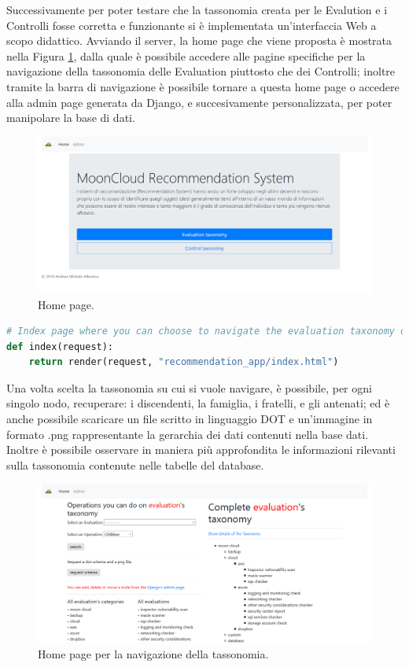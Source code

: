 %
\newpage
%
\hfill\break
Successivamente per poter testare che la tassonomia creata per le Evalution e i Controlli fosse corretta e funzionante si è 
implementata un'interfaccia Web a scopo didattico.
Avviando il server, la home page che viene proposta è mostrata nella Figura \ref{fig:MCRS_homepage}, dalla quale è possibile 
accedere alle pagine specifiche per la navigazione della tassonomia delle Evaluation piuttosto che dei Controlli; inoltre 
tramite la barra di navigazione è possibile tornare a questa home page o accedere alla admin page generata da Django, e 
succesivamente personalizzata, per poter manipolare la base di dati.
\begin{figure}[ht!]
    \includegraphics[scale=0.3]{images/MCRS_homepage.png}
    \caption{Home page.}
    \label{fig:MCRS_homepage}
\end{figure}
\lstset{style=python_code_style}
\begin{lstlisting}[language=Python, label=lst:view_homepage, caption={Parte principale del codice delle View della soluzione per gestire l'accesso 
    alla home page.}]
# Index page where you can choose to navigate the evaluation taxonomy or the control taxonomy
def index(request):
    return render(request, "recommendation_app/index.html")
\end{lstlisting}
%
Una volta scelta la tassonomia su cui si vuole navigare, è possibile, per ogni singolo nodo, recuperare: i 
discendenti, la famiglia, i fratelli, e gli antenati; ed è anche possibile scaricare un file scritto in linguaggio 
DOT e un'immagine in formato .png rappresentante la gerarchia dei dati contenuti nella base dati.
Inoltre è possibile osservare in maniera più approfondita le informazioni rilevanti sulla tassonomia contenute nelle tabelle 
del database.
\begin{figure}
    \includegraphics[scale=0.3]{images/MCRS_taxindex.png}
    \caption{Home page per la navigazione della tassonomia.}
    \label{fig:MCRS_taxindex}
\end{figure}
